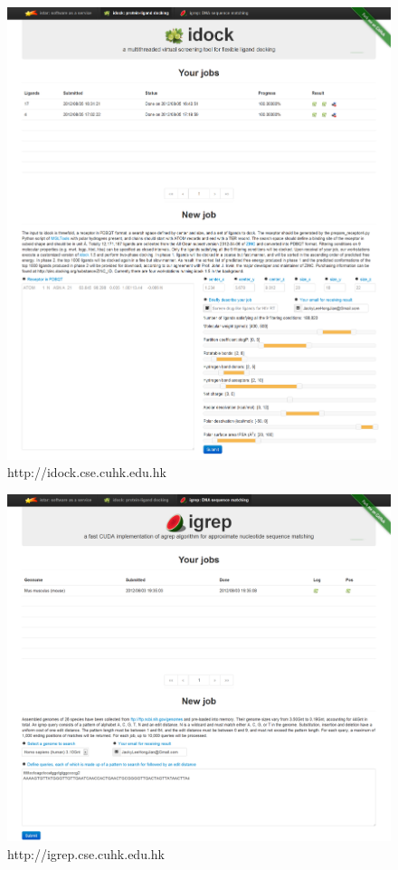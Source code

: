 \begin{figure}
\centering
\includegraphics[width=\linewidth]{istar/idock.png}
\caption{http://idock.cse.cuhk.edu.hk}
\label{istar:idock}
\end{figure}

\begin{figure}
\centering
\includegraphics[width=\linewidth]{istar/igrep.png}
\caption{http://igrep.cse.cuhk.edu.hk}
\label{istar:igrep}
\end{figure}

